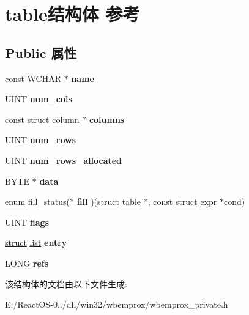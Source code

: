 \hypertarget{structtable}{}\section{table结构体 参考}
\label{structtable}
\subsection*{Public 属性}
\begin{DoxyCompactItemize}
\item 
\mbox{\label{structtable_a685dc874e587838a5074cc493fc1472b}} 
const W\+C\+H\+AR $\ast$ {\bfseries name}
\item 
\mbox{\label{structtable_a9a7369b19e0bde510c992507464169bb}} 
U\+I\+NT {\bfseries num\+\_\+cols}
\item 
\mbox{\label{structtable_a3d56afa96ee842ce30dfba2b1dae0d7a}} 
const \hyperlink{interfacestruct}{struct} \hyperlink{structcolumn}{column} $\ast$ {\bfseries columns}
\item 
\mbox{\label{structtable_a26569a0aef2fd807a2fae7460a35b5f7}} 
U\+I\+NT {\bfseries num\+\_\+rows}
\item 
\mbox{\label{structtable_ab08c1c550a11f78c5bf3fc79f470fb1f}} 
U\+I\+NT {\bfseries num\+\_\+rows\+\_\+allocated}
\item 
\mbox{\label{structtable_ad6009a08306b3c9aa0cc63ec0210078b}} 
B\+Y\+TE $\ast$ {\bfseries data}
\item 
\mbox{\label{structtable_a2e87b571e546faa3b1842ebdd5db3fdf}} 
\hyperlink{interfaceenum}{enum} fill\+\_\+status($\ast$ {\bfseries fill} )(\hyperlink{interfacestruct}{struct} \hyperlink{structtable}{table} $\ast$, const \hyperlink{interfacestruct}{struct} \hyperlink{structexpr}{expr} $\ast$cond)
\item 
\mbox{\label{structtable_aa3962a8a47863f876d2259189c784a13}} 
U\+I\+NT {\bfseries flags}
\item 
\mbox{\label{structtable_abcc2202268f495d2513ac8936cc33086}} 
\hyperlink{interfacestruct}{struct} \hyperlink{classlist}{list} {\bfseries entry}
\item 
\mbox{\label{structtable_aac88f247d2cf1563ff5ad907f2e108e6}} 
L\+O\+NG {\bfseries refs}
\end{DoxyCompactItemize}


该结构体的文档由以下文件生成\+:\begin{DoxyCompactItemize}
\item 
E\+:/\+React\+O\+S-\/0../dll/win32/wbemprox/wbemprox\+\_\+private.\+h\end{DoxyCompactItemize}
